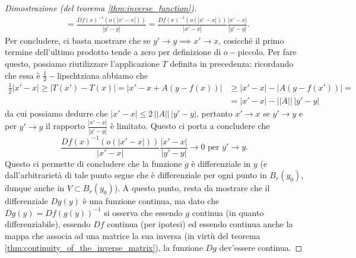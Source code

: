 \begin{proof}[Dimostrazione (del teorema \ref{thm:inverse_function})]
\begin{align*}
    &=\frac{Df(x)^{-1}(o(|x'-x|))}{|y'-y|} = \frac{Df(x)^{-1}(o(|x'-x|))}{|x'-x|} \frac{|x'-x|}{|y'-y|}.
    \end{align*}
    Per concludere, ci basta mostrare che se $y' \to y \implies x' \to x$, cosicché il primo termine dell'ultimo prodotto tende a zero per definizione di $o-$piccolo. Per fare questo, possiamo riutilizzare
    l'applicazione $T$ definita in precedenza: ricordando che essa è $\frac{1}{2}-$lipschtziana abbiamo che
    \begin{align*}
    \frac{1}{2} |x' - x| \geq  |T(x') - T(x)| = |x' - x + A(y - f(x))| &\geq |x' - x| - |A(y - f(x'))| = & \\
    &=|x'-x| - || A || \, |y'-y| &
    \end{align*}
    da cui possiamo dedurre che $|x' - x| \leq 2 \, || A || \, |y' - y|$, pertanto $x' \to x$ se $y' \to y$ e per $y' \to y$ il rapporto $\frac{|x'-x|}{|y'-y|}$ è limitato. Questo ci porta a concludere che
    $$
    \frac{Df(x)^{-1}(o(|x'-x|))}{|x'-x|} \frac{|x'-x|}{|y'-y|} \to 0 \text{ per } y' \to y.
    $$
    Questo ci permette di concludere che la funzione $g$ è differenziale in $y$ (e dall'arbitrarietà di tale punto segue che è differenziale per ogni punto in $B_r(y_0)$, dunque anche in $V \subset B_r(y_0)$). A
    questo punto, resta da mostrare che il differenziale $Dg(y)$ è una funzione continua, ma dato che $Dg(y) = Df(g(y))^{-1}$ si osserva che essendo $g$ continua (in quanto differenziabile), essendo $Df$ continua (per ipotesi)
    ed essendo continua anche la mappa che associa ad una matrice la sua inversa (in virtù del teorema \ref{thm:continuity_of_the_inverse_matrix}), la funzione $Dg$ dev'essere continua.
\end{proof}